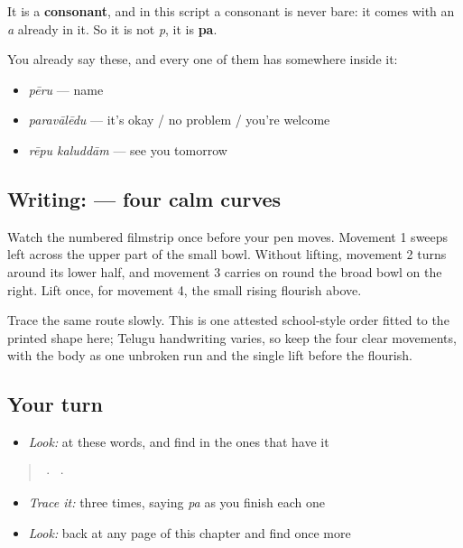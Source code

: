 It is a \textbf{consonant}, and in this script a consonant is never bare: it comes with an \emph{a} already in it. So it is not \emph{p}, it is \textbf{pa}.

You already say these, and every one of them has  somewhere inside it:

\begin{itemize}
\raggedright
  \item \textbf{} \emph{pēru} — name
  \item \textbf{} \emph{paravālēdu} — it's okay / no problem / you're welcome
  \item \textbf{ } \emph{rēpu kaluddām} — see you tomorrow
\end{itemize}

\subsection*{Writing:  — four calm curves}

Watch the numbered filmstrip once before your pen moves. Movement 1 sweeps left across the upper part of the small bowl. Without lifting, movement 2 turns around its lower half, and movement 3 carries on round the broad bowl on the right. Lift once, for movement 4, the small rising flourish above.

Trace the same route slowly. This is one attested school-style order fitted to the printed shape here; Telugu handwriting varies, so keep the four clear movements, with the body as one unbroken run and the single lift before the flourish.

\subsection*{Your turn}
\begin{itemize}
\raggedright
  \item \emph{Look:} at these words, and find  in the ones that have it
\end{itemize}

\begin{quote}
  ·    ·  
\end{quote}

\begin{itemize}
\raggedright
  \item \emph{Trace it:}  three times, saying \emph{pa} as you finish each one
  \item \emph{Look:} back at any page of this chapter and find  once more
\end{itemize}

